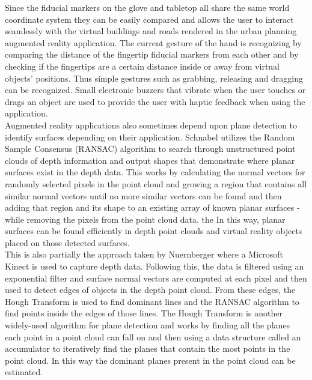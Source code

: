 Since the fiducial markers on the glove and tabletop all share the same world coordinate system they can be easily compared and allows the user to interact seamlessly with the virtual buildings and roads rendered in the urban planning augmented reality application. The current gesture of the hand is recognizing by comparing the distance of the fingertip fiducial markers from each other and by checking if the fingertips are a certain distance inside or away from virtual objects' positions. Thus simple gestures such as grabbing, releasing and dragging can be recognized. Small electronic buzzers that vibrate when the user touches or drags an object are used to provide the user with haptic feedback when using the application. \\

Augmented reality applications also sometimes depend upon plane detection to identify surfaces depending on their application. Schnabel \cite{ransacpointcloud} utilizes the Random Sample Consensus (RANSAC) algorithm to search through unstructured point clouds of depth information and output shapes that demonstrate where planar surfaces exist in the depth data. This works by calculating the normal vectors for randomly selected pixels in the point cloud and growing a region that contains all similar normal vectors until no more similar vectors can be found and then adding that region and its shape to an existing array of known planar surfaces - while removing the pixels from the point cloud data. the In this way, planar surfaces can be found efficiently in depth point clouds and virtual reality objects placed on those detected surfaces. \\

This is also partially the approach taken by Nuernberger \cite{snaptoreality} where a Microsoft Kinect is used to capture depth data. Following this, the data is filtered using an exponential filter and surface normal vectors are computed at each pixel and then used to detect edges of objects in the depth point cloud. From these edges, the Hough Transform is used to find dominant lines and the RANSAC algorithm to find points inside the edges of those lines. The Hough Transform is another widely-used algorithm for plane detection and works by finding all the planes each point in a point cloud can fall on and then using a data structure called an accumulator to iteratively find the planes that contain the most points in the point cloud. In this way the dominant planes present in the point cloud can be estimated. \\

